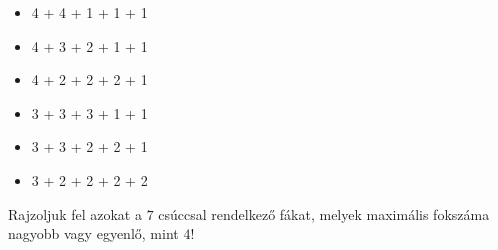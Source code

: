 \begin{solution}
\begin{enumerate}
\begin{minipage}[c]{0.34\textwidth}%
 \hspace{0cm} 
\begin{itemize}
\item[] 4 + 4 + 1 + 1 + 1 
\item[] 4 + 3 + 2 + 1 + 1 
\item[] 4 + 2 + 2 + 2 + 1 
\end{itemize}
\hspace{0cm} %
\end{minipage}%
\begin{minipage}[c]{0.49\textwidth}%
 \hspace{0cm} 
\begin{itemize}
\item[] 3 + 3 + 3 + 1 + 1 
\item[] 3 + 3 + 2 + 2 + 1 
\item[] 3 + 2 + 2 + 2 + 2 
\end{itemize}
\hspace{0cm} %
\end{minipage}

\end{enumerate}
\end{solution}
\begin{problem}
Rajzoljuk fel azokat a $7$ csúccsal rendelkező fákat, melyek maximális
fokszáma nagyobb vagy egyenlő, mint $4$! 
\end{problem}
